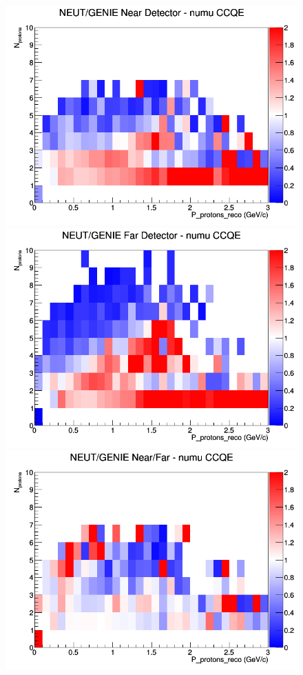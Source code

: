 \documentclass[12pt]{article}
\begin{document}
 
\begin{figure}[h]
\includegraphics[width=\linewidth]{eff_N_P/FGT/protons/ratios/CCQE_NEUT_GENIE_numu_near_N_P.png}
\endminipage
{}
\includegraphics[width=\linewidth]{eff_N_P/FGT/protons/ratios/CCQE_NEUT_GENIE_numu_far_N_P.png}
\endminipage
{}
\includegraphics[width=\linewidth]{eff_N_P/FGT/protons/ratios/CCQE_NEUT_GENIE_numu_NF_N_P.png}

\end{figure}
\end{document}
